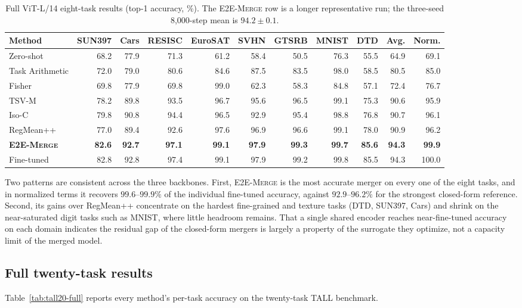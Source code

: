 \documentclass[letterpaper]{article} %
\newcommand{\method}{\textup{\textsc{E2E-Merge}}\xspace}
\theoremstyle{plain}
\theoremstyle{definition}
\begin{document}
\begin{table}[tb]
\centering
{\small
\begin{tabular*}{\textwidth}{@{\extracolsep{\fill}}lrrrrrrrrrr}
\toprule
Method & SUN397 & Cars & RESISC & EuroSAT & SVHN & GTSRB & MNIST & DTD & Avg. & Norm. \\
\midrule
Zero-shot & 68.2 & 77.9 & 71.3 & 61.2 & 58.4 & 50.5 & 76.3 & 55.5 & 64.9 & 69.1 \\
Task Arithmetic & 72.0 & 79.0 & 80.6 & 84.6 & 87.5 & 83.5 & 98.0 & 58.5 & 80.5 & 85.0 \\
Fisher & 69.8 & 77.9 & 69.8 & 99.0 & 62.3 & 58.3 & 84.8 & 57.1 & 72.4 & 76.7 \\
TSV-M & 78.2 & 89.8 & 93.5 & 96.7 & 95.6 & 96.5 & 99.1 & 75.3 & 90.6 & 95.9 \\
Iso-C & 79.8 & 90.8 & 94.4 & 96.5 & 92.9 & 95.4 & 98.8 & 76.8 & 90.7 & 96.1 \\
RegMean++ & 77.0 & 89.4 & 92.6 & 97.6 & 96.9 & 96.6 & 99.1 & 78.0 & 90.9 & 96.2 \\
\textbf{\method} & \textbf{82.6} & \textbf{92.7} & \textbf{97.1} & \textbf{99.1} & \textbf{97.9} & \textbf{99.3} & \textbf{99.7} & \textbf{85.6} & \textbf{94.3} & \textbf{99.9} \\
\midrule
Fine-tuned & 82.8 & 92.8 & 97.4 & 99.1 & 97.9 & 99.2 & 99.8 & 85.5 & 94.3 & 100.0 \\
\bottomrule
\end{tabular*}
}
\caption{Full ViT-L/14 eight-task results (top-1 accuracy, \%). The \method row is a
longer representative run; the three-seed 8,000-step mean is $94.2\pm0.1$.}
\label{tab:l14-full}
\end{table}

Two patterns are consistent across the three backbones.
First, \method is the most accurate merger on every one of the eight tasks, and in normalized terms it recovers $99.6$--$99.9\%$ of the individual fine-tuned accuracy, against $92.9$--$96.2\%$ for the strongest closed-form reference.
Second, its gains over RegMean++ concentrate on the hardest fine-grained and texture tasks (DTD, SUN397, Cars) and shrink on the near-saturated digit tasks such as MNIST, where little headroom remains.
That a single shared encoder reaches near-fine-tuned accuracy on each domain indicates the residual gap of the closed-form mergers is largely a property of the surrogate they optimize, not a capacity limit of the merged model.

\subsection{Full twenty-task results}
\label{app:tall20-full}
Table~\ref{tab:tall20-full} reports every method's per-task accuracy on the twenty-task TALL benchmark.
\end{document}
